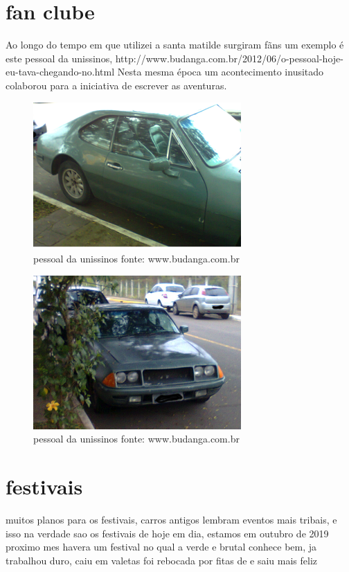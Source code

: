 \documentclass[a4paper]{report}
\begin{document}
\section*{fan clube}

Ao longo do tempo em que utilizei a santa matilde surgiram f\~ans um exemplo \'e este pessoal da unissinos, http://www.budanga.com.br/2012/06/o-pessoal-hoje-eu-tava-chegando-no.html 
Nesta mesma \'epoca um acontecimento inusitado colaborou para a iniciativa de escrever as aventuras.

\begin{figure}[!htb]
\centering
\includegraphics{Foto0296}
\caption{pessoal da unissinos fonte: www.budanga.com.br}
\label{fan clube de S\~ao Leopoldo}
\end{figure}


\begin{figure}[!htb]
\centering
\includegraphics{Foto0295}
\caption{pessoal da unissinos fonte: www.budanga.com.br}
\label{Blog do pessoal da Tecnosinos }
\end{figure}
\clearpage



\section*{festivais}
	muitos planos para os festivais, carros antigos lembram eventos mais tribais, e isso na verdade sao os festivais de hoje em dia, 
        estamos em outubro de 2019 proximo mes havera um festival no qual a verde e brutal conhece bem, ja trabalhou duro, caiu em valetas
        foi rebocada por fitas de e saiu mais feliz 
\end{document}
